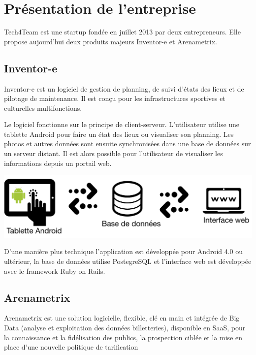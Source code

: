 \chapter{Présentation de l'entreprise}


Tech4Team est une startup fondée en juillet 2013 par deux entrepreneurs. Elle propose aujourd'hui deux produits majeurs Inventor-e et Arenametrix.

\section{Inventor-e}
Inventor-e est un logiciel de gestion de planning, de suivi d’états des lieux et de pilotage de maintenance. Il est conçu pour les infrastructures sportives et culturelles multifonctions.

Le logiciel fonctionne sur le principe de client-serveur. L'utilisateur utilise une tablette Android pour faire un état des lieux ou visualiser son planning. Les photos et autres données sont ensuite synchronisées dans une base de données sur un serveur distant. Il est alors possible pour l'utilisateur de visualiser les informations depuis un portail web.

\begin{center}
\includegraphics[scale=0.7]{images/inventore.png}
\label{inventore}
\end{center}

D'une manière plus technique l'application est développée pour Android 4.0 ou ultérieur, la base de données utilise PostegreSQL et l'interface web est développée avec le framework Ruby on Rails.

\section{Arenametrix}
Arenametrix est une solution logicielle, flexible, clé en main et intégrée de Big Data (analyse et exploitation des données billetteries), disponible en SaaS, pour la connaissance et la fidélisation des publics, la prospection ciblée et la mise en place d'une nouvelle politique de tarification

